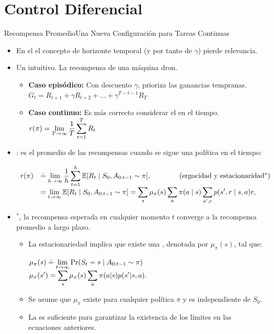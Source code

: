 \documentclass[10pt, envcountsect, handout, aspectratio=1610, hyperref={hypertexnames=true}]{beamer}
\begin{document}
\section{Control Diferencial}


\begin{frame}{Recompensa Promedio}{Una Nueva Configuración para Tareas Continuas}
	
	\begin{itemize}
		\item En el  el concepto de horizonte temporal (y por tanto de $\gamma$) pierde relevancia.
		
		\item Un  intuitivo. La recompensa de una máquina dron.
		\begin{itemize}
			\item \textbf{Caso episódico:} Con descuento $\gamma$,  prioriza las ganancias tempranas. $G_t=R_{t+1}+\gamma  R_{t+2} + \ldots + \gamma^{T-t-1}R_T$
			\item \textbf{Caso continuo:} Es más correcto considerar el  en el tiempo. \(\displaystyle r(\pi) = \lim_{T \to \infty} \frac{1}{T} \sum_{t=1}^T R_t\)
		\end{itemize}
		
		\item {}: es el promedio de las recompensas cuando se sigue una política en el tiempo:
	
	\centerline{$\begin{array}{ll}
			r(\pi) &\displaystyle \doteq \lim_{h \to \infty} \frac{1}{h} \sum_{t=1}^{h} \mathbb{E}[R_t \mid S_0, A_{0:t-1} \sim \pi], \qquad\qquad\text{\color{black}(ergocidad y estacionaridad$^*$)} \\
			& \displaystyle = \lim_{t \to \infty} \mathbb{E}[R_t \mid S_0, A_{0:t-1} \sim \pi]  
			= \sum_s \mu_{\pi}(s) \sum_a \pi(a \mid s) \sum_{s',r} p(s', r \mid s, a) r,
		\end{array}$}
		
		\item {}$^*$, la recompensa esperada en cualquier momento \(t\) converge a la recompensa promedio a largo plazo.
			\begin{itemize}
				\item La estacionariedad implica que existe una , denotada por \(\mu_\pi(s)\), tal que:
				\centerline{
					$\displaystyle \mu_\pi(s) \doteq \lim_{t \to \infty} \text{Pr}(S_t = s \mid A_{0:t-1} \sim \pi)$ \qquad $\displaystyle  \mu_\pi(s')=\sum_{s} \mu_\pi(s) \sum_{a} \pi(a|s) p(s'|s, a).$}
				\item Se asume que $\mu_\pi$ existe para cualquier política $\pi$ y es independiente de $S_0$. 
				\item La  es suficiente para garantizar la existencia de los límites en las ecuaciones anteriores.
				

\end{itemize}
\end{itemize}
\end{frame}
\end{document}
